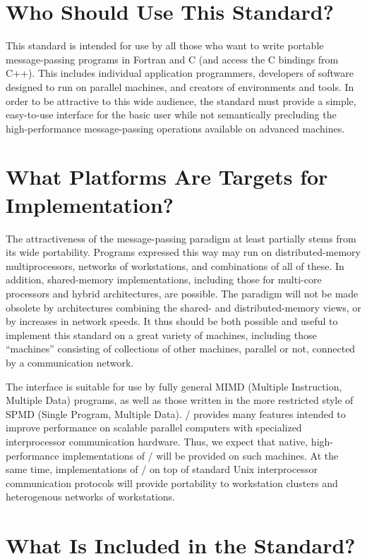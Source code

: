 \section{Who Should Use This Standard?}

This standard is intended for use by all those who want to write portable
message-passing programs in
Fortran and C (and access the C bindings
from C++).
This includes individual application programmers,
developers of software designed to run on parallel machines, and creators of
environments and tools.  In order to be
attractive to this wide audience, the standard must provide a simple, easy-to-use
interface for the basic user while not semantically precluding the
high-performance message-passing operations available on advanced machines.


\section{What Platforms Are Targets for Implementation?}

The attractiveness of the message-passing paradigm at least partially
stems from its wide portability.  Programs expressed this way may run
on distributed-memory
multiprocessors, networks of workstations, and combinations of all of these.
In addition, shared-memory implementations,
including those for multi-core processors and hybrid
architectures,
are possible.
The paradigm will not be made obsolete by architectures combining the shared-
and distributed-memory views, or by increases in network speeds.  It thus
should be both possible and useful to implement this standard on a great
variety of machines, including those ``machines'' consisting of collections of
other machines, parallel or not, connected by a communication network.

The interface is suitable for use by fully general MIMD (Multiple Instruction,
Multiple Data) programs, as well as
those written in the more restricted style of
SPMD (Single Program, Multiple Data).
\MPI/ provides many features intended to improve performance on
scalable parallel computers with
specialized interprocessor communication
hardware.  Thus, we expect that native, high-performance
implementations of \MPI/ will be provided on such machines.  At the
same time, implementations of \MPI/ on top of standard Unix
interprocessor communication protocols will provide portability to
workstation clusters and heterogenous networks of workstations.

\section{What Is Included in the Standard?}

